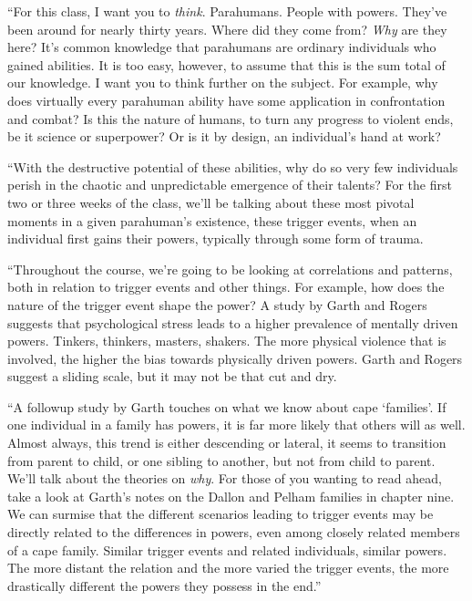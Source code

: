 ``For this class, I want you to \emph{think}.  Parahumans.  People with powers.  They've been around for nearly thirty years.  Where did they come from?  \emph{Why} are they here?  It's common knowledge that parahumans are ordinary individuals who gained abilities.  It is too easy, however, to assume that this is the sum total of our knowledge.  I want you to think further on the subject.  For example, why does virtually every parahuman ability have some application in confrontation and combat?  Is this the nature of humans, to turn any progress to violent ends, be it science or superpower?  Or is it by design, an individual's hand at work?



``With the destructive potential of these abilities, why do so very few individuals perish in the chaotic and unpredictable emergence of their talents?  For the first two or three weeks of the class, we'll be talking about these most pivotal moments in a given parahuman's existence, these trigger events, when an individual first gains their powers, typically through some form of trauma.



``Throughout the course, we're going to be looking at correlations and patterns, both in relation to trigger events and other things.  For example, how does the nature of the trigger event shape the power?  A study by Garth and Rogers suggests that psychological stress leads to a higher prevalence of mentally driven powers.  Tinkers, thinkers, masters, shakers.  The more physical violence that is involved, the higher the bias towards physically driven powers.  Garth and Rogers suggest a sliding scale, but it may not be that cut and dry.



``A followup study by Garth touches on what we know about cape `families'.  If one individual in a family has powers, it is far more likely that others will as well.  Almost always, this trend is either descending or lateral, it seems to transition from parent to child, or one sibling to another, but not from child to parent.  We'll talk about the theories on \emph{why}.  For those of you wanting to read ahead, take a look at Garth's notes on the Dallon and Pelham families in chapter nine.  We can surmise that the different scenarios leading to trigger events may be directly related to the differences in powers, even among closely related members of a cape family.  Similar trigger events and related individuals, similar powers.  The more distant the relation and the more varied the trigger events, the more drastically different the powers they possess in the end.''



